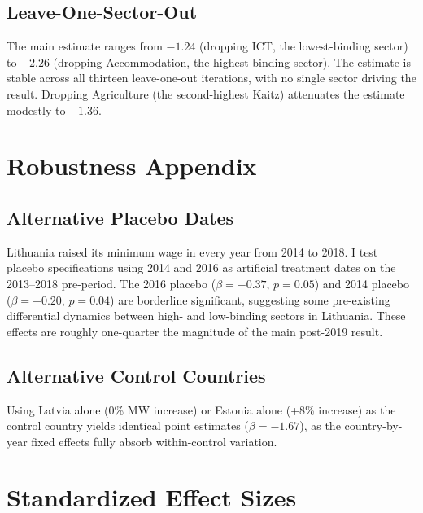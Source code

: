 \documentclass[12pt]{article}
\begin{document}
\subsection{Leave-One-Sector-Out}

The main estimate ranges from $-1.24$ (dropping ICT, the lowest-binding sector) to $-2.26$ (dropping Accommodation, the highest-binding sector). The estimate is stable across all thirteen leave-one-out iterations, with no single sector driving the result. Dropping Agriculture (the second-highest Kaitz) attenuates the estimate modestly to $-1.36$.

\section{Robustness Appendix}

\subsection{Alternative Placebo Dates}

Lithuania raised its minimum wage in every year from 2014 to 2018. I test placebo specifications using 2014 and 2016 as artificial treatment dates on the 2013--2018 pre-period. The 2016 placebo ($\beta = -0.37$, $p = 0.05$) and 2014 placebo ($\beta = -0.20$, $p = 0.04$) are borderline significant, suggesting some pre-existing differential dynamics between high- and low-binding sectors in Lithuania. These effects are roughly one-quarter the magnitude of the main post-2019 result.

\subsection{Alternative Control Countries}

Using Latvia alone (0\% MW increase) or Estonia alone (+8\% increase) as the control country yields identical point estimates ($\beta = -1.67$), as the country-by-year fixed effects fully absorb within-control variation.

\section{Standardized Effect Sizes}
\label{sec:sde}


\end{document}
